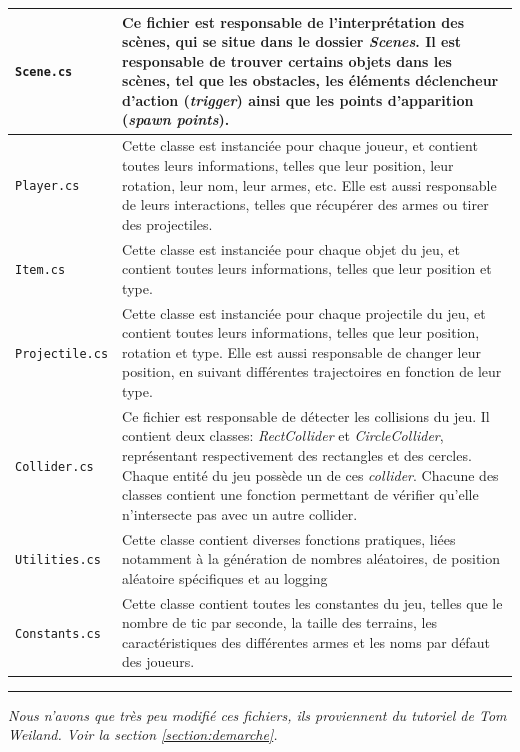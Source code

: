 \documentclass[a4paper]{article}
\begin{document}
\begin{center}
\begin{longtable}{|l|p{10cm}|}
    \hline
    \texttt{Scene.cs} & Ce fichier est responsable de l’interprétation des scènes, qui se situe dans le dossier \emph{Scenes}. Il est responsable de trouver certains objets dans les scènes, tel que les obstacles, les éléments déclencheur d’action (\textit{trigger}) ainsi que les points d’apparition (\textit{spawn points}).\\
    \hline
    \texttt{Player.cs} & Cette classe est instanciée pour chaque joueur, et contient toutes leurs informations, telles que leur position, leur rotation, leur nom, leur armes, etc. Elle est aussi responsable de leurs interactions, telles que récupérer des armes ou tirer des projectiles.\\
    \hline
    \texttt{Item.cs} & Cette classe est instanciée pour chaque objet du jeu, et contient toutes leurs informations, telles que leur position et type.\\
    \hline
    \texttt{Projectile.cs} & Cette classe est instanciée pour chaque projectile du jeu, et contient toutes leurs informations, telles que leur position, rotation et type. Elle est aussi responsable de changer leur position, en suivant différentes trajectoires en fonction de leur type.\\
    \hline
    \texttt{Collider.cs} & Ce fichier est responsable de détecter les collisions du jeu. Il contient deux classes: \emph{RectCollider} et \emph{CircleCollider}, représentant respectivement des rectangles et des cercles. Chaque entité du jeu possède un de ces \textit{collider}. Chacune des classes contient une fonction permettant de vérifier qu'elle n’intersecte pas avec un autre collider.\\
    \hline
    \texttt{Utilities.cs} & Cette classe contient diverses fonctions pratiques, liées notamment à la génération de nombres aléatoires, de position aléatoire spécifiques et au logging\\
    \hline
    \texttt{Constants.cs} & Cette classe contient toutes les constantes du jeu, telles que le nombre de tic par seconde, la taille des terrains, les caractéristiques des différentes armes et les noms par défaut des joueurs.\\ 
    \hline
\end{longtable}
\end{center}
\hrule
\textit{\footnotemark[1]Nous n’avons que très peu modifié ces fichiers, ils proviennent du tutoriel de Tom Weiland. Voir la section \ref{section:demarche}.}
\end{document}
